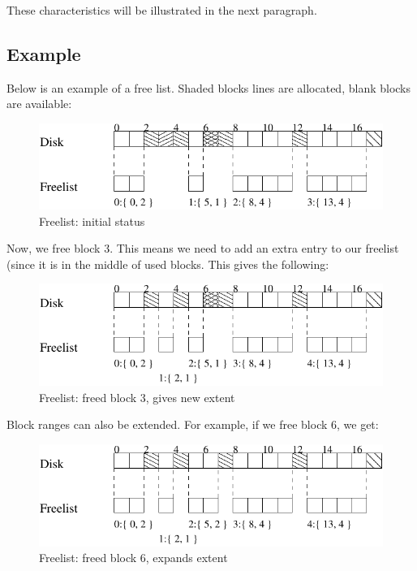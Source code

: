 These characteristics will be illustrated in the next paragraph.

\subsection{Example}

Below is an example of a free list. Shaded blocks lines are allocated, blank blocks are available:

\begin{figure}[h]
\includegraphics[width=12cm]{freelist1}
\caption{Freelist: initial status}
\end{figure}

Now, we free block 3. This means we need to add an extra entry to our freelist (since it is in the middle of used blocks. This gives the following:

\begin{figure}[h]
\includegraphics[width=12cm]{freelist2}
\caption{Freelist: freed block 3, gives new extent}
\end{figure}

\newpage

Block ranges can also be extended. For example, if we free block 6, we get:

\begin{figure}[h]
\includegraphics[width=12cm]{freelist3}
\caption{Freelist: freed block 6, expands extent}
\end{figure}

